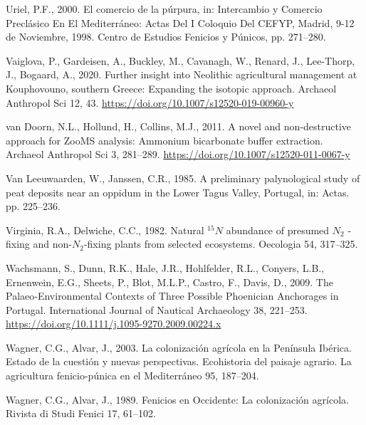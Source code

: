 \documentclass[preprint, 3p, authoryear]{elsarticle} %
\newlength{\cslhangindent}
\newlength{\cslentryspacingunit} %
\newenvironment{CSLReferences}[2] %
 {%
  \setlength{\parindent}{0pt}
  \ifodd #1
  \let\oldpar\par
  \def\par{\hangindent=\cslhangindent\oldpar}
  \fi
  \setlength{\parskip}{#2\cslentryspacingunit}
 }%
 {}
\begin{document}
\begin{CSLReferences}{1}{0}
\leavevmode{}%
Uriel, P.F., 2000. El comercio de la púrpura, in: Intercambio y Comercio Preclásico En El {Mediterráneo}: Actas Del {I} Coloquio Del {CEFYP}, {Madrid}, 9-12 de Noviembre, 1998. {Centro de Estudios Fenicios y Púnicos}, pp. 271--280.

\leavevmode{}%
Vaiglova, P., Gardeisen, A., Buckley, M., Cavanagh, W., Renard, J., Lee-Thorp, J., Bogaard, A., 2020. Further insight into {Neolithic} agricultural management at {Kouphovouno}, southern {Greece}: Expanding the isotopic approach. Archaeol Anthropol Sci 12, 43. \url{https://doi.org/10.1007/s12520-019-00960-y}

\leavevmode{}%
van Doorn, N.L., Hollund, H., Collins, M.J., 2011. A novel and non-destructive approach for {ZooMS} analysis: Ammonium bicarbonate buffer extraction. Archaeol Anthropol Sci 3, 281--289. \url{https://doi.org/10.1007/s12520-011-0067-y}

\leavevmode{}%
Van Leeuwaarden, W., Janssen, C.R., 1985. A preliminary palynological study of peat deposits near an oppidum in the {Lower Tagus Valley}, {Portugal}, in: Actas. pp. 225--236.

\leavevmode{}%
Virginia, R.A., Delwiche, C.C., 1982. Natural \(^{15}N\) abundance of presumed \(N_{2}\) -fixing and non-\(N_{2}\)-fixing plants from selected ecosystems. Oecologia 54, 317--325.

\leavevmode{}%
Wachsmann, S., Dunn, R.K., Hale, J.R., Hohlfelder, R.L., Conyers, L.B., Ernenwein, E.G., Sheets, P., Blot, M.L.P., Castro, F., Davis, D., 2009. The {Palaeo}‐{Environmental Contexts} of {Three Possible Phoenician Anchorages} in {Portugal}. International Journal of Nautical Archaeology 38, 221--253. \url{https://doi.org/10.1111/j.1095-9270.2009.00224.x}

\leavevmode{}%
Wagner, C.G., Alvar, J., 2003. La colonización agrícola en la {Península Ibérica}. {Estado} de la cuestión y nuevas perspectivas. Ecohistoria del paisaje agrario. La agricultura fenicio-púnica en el Mediterráneo 95, 187--204.

\leavevmode{}%
Wagner, C.G., Alvar, J., 1989. Fenicios en {Occidente}: La colonización agrícola. Rivista di Studi Fenici 17, 61--102.


\end{CSLReferences}
\end{document}
